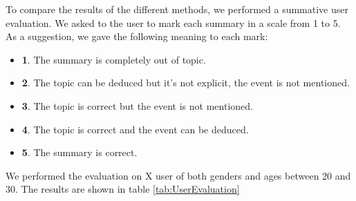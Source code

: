 

To compare the results of the different methods, we performed a summative user evaluation. We asked to the user to mark each summary in a scale from 1 to 5. As a suggestion, we gave the following meaning to each mark:
\begin{itemize}
\item \textbf{1}. The summary is completely out of topic.
\item \textbf{2}. The topic can be deduced but it's not explicit, the event is not mentioned.
\item \textbf{3}. The topic is correct but the event is not mentioned.
\item \textbf{4}. The topic is correct and the event can be deduced.
\item \textbf{5}. The summary is correct.
\end{itemize}

We performed the evaluation on X user of both genders and ages between 20 and 30. The results are shown in table \ref{tab:UserEvaluation}